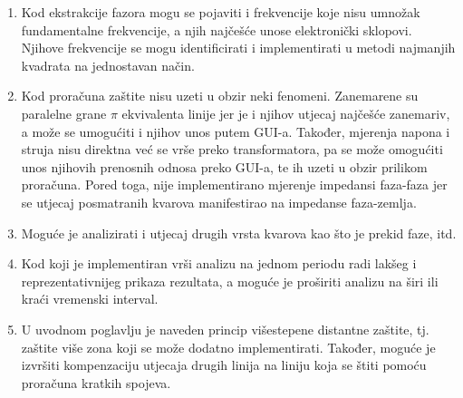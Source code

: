 \begin{enumerate}
    \item Kod ekstrakcije fazora mogu se pojaviti i frekvencije koje nisu umnožak fundamentalne frekvencije, a njih najčešće unose elektronički sklopovi. Njihove frekvencije se mogu identificirati i implementirati u metodi najmanjih kvadrata na jednostavan način.
    \item Kod proračuna zaštite nisu uzeti u obzir neki fenomeni. Zanemarene su paralelne grane $\pi$ ekvivalenta linije jer je i njihov utjecaj najčešće zanemariv, a može se umogućiti i njihov unos putem GUI-a. Također, mjerenja napona i struja nisu direktna već se vrše preko transformatora, pa se može omogućiti unos njihovih prenosnih odnosa preko GUI-a, te ih uzeti u obzir prilikom proračuna. Pored toga, nije implementirano mjerenje impedansi faza-faza jer se utjecaj posmatranih kvarova manifestirao na impedanse faza-zemlja.
    \item Moguće je analizirati i utjecaj drugih vrsta kvarova kao što je prekid faze, itd.
    \item Kod koji je implementiran vrši analizu na jednom periodu radi lakšeg i reprezentativnijeg prikaza rezultata, a moguće je proširiti analizu na širi ili kraći vremenski interval.
    \item U uvodnom poglavlju je naveden princip višestepene distantne zaštite, tj. zaštite više zona koji se može dodatno implementirati. Također, moguće je izvršiti kompenzaciju utjecaja drugih linija na liniju koja se štiti pomoću proračuna kratkih spojeva.  
\end{enumerate}